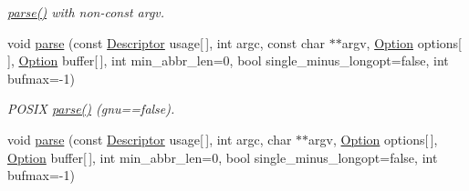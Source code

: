 \begin{DoxyCompactItemize}
\begin{DoxyCompactList}\small\item\em \hyperlink{classoption_1_1_parser_a6e0b5778d1cfbd6cd51240e74d01e138}{parse()} with non-\/const argv. \end{DoxyCompactList}\item 
\hypertarget{classoption_1_1_parser_a41885a7308249c8532714e15b36106bd}{void \hyperlink{classoption_1_1_parser_a41885a7308249c8532714e15b36106bd}{parse} (const \hyperlink{structoption_1_1_descriptor}{\-Descriptor} usage\mbox{[}$\,$\mbox{]}, int argc, const char $\ast$$\ast$argv, \hyperlink{classoption_1_1_option}{\-Option} options\mbox{[}$\,$\mbox{]}, \hyperlink{classoption_1_1_option}{\-Option} buffer\mbox{[}$\,$\mbox{]}, int min\-\_\-abbr\-\_\-len=0, bool single\-\_\-minus\-\_\-longopt=false, int bufmax=-\/1)}\label{classoption_1_1_parser_a41885a7308249c8532714e15b36106bd}

\begin{DoxyCompactList}\small\item\em \-P\-O\-S\-I\-X \hyperlink{classoption_1_1_parser_a6e0b5778d1cfbd6cd51240e74d01e138}{parse()} (gnu==false). \end{DoxyCompactList}\item 
\hypertarget{classoption_1_1_parser_ad40585faa23a97a186cf9a45b8c2b42b}{void \hyperlink{classoption_1_1_parser_ad40585faa23a97a186cf9a45b8c2b42b}{parse} (const \hyperlink{structoption_1_1_descriptor}{\-Descriptor} usage\mbox{[}$\,$\mbox{]}, int argc, char $\ast$$\ast$argv, \hyperlink{classoption_1_1_option}{\-Option} options\mbox{[}$\,$\mbox{]}, \hyperlink{classoption_1_1_option}{\-Option} buffer\mbox{[}$\,$\mbox{]}, int min\-\_\-abbr\-\_\-len=0, bool single\-\_\-minus\-\_\-longopt=false, int bufmax=-\/1)}\label{classoption_1_1_parser_ad40585faa23a97a186cf9a45b8c2b42b}


\end{DoxyCompactItemize}
